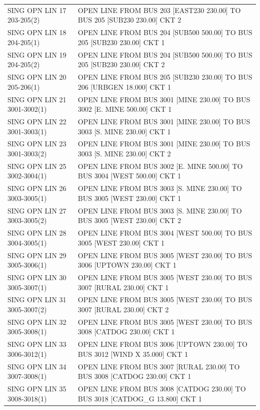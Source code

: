 \documentclass[10pt]{report}
\begin{document}
\begin{table}
{\begin{tabular}{ll}
SING OPN LIN   17 203-205(2) & OPEN LINE FROM BUS 203 [EAST230 230.00] TO BUS 205 [SUB230 230.00] CKT 2 \\
SING OPN LIN   18 204-205(1) & OPEN LINE FROM BUS 204 [SUB500 500.00] TO BUS 205 [SUB230 230.00] CKT 1 \\
SING OPN LIN   19 204-205(2) & OPEN LINE FROM BUS 204 [SUB500 500.00] TO BUS 205 [SUB230 230.00] CKT 2 \\
SING OPN LIN   20 205-206(1) & OPEN LINE FROM BUS 205 [SUB230 230.00] TO BUS 206 [URBGEN 18.000] CKT 1 \\
SING OPN LIN   21 3001-3002(1) & OPEN LINE FROM BUS 3001 [MINE 230.00] TO BUS 3002 [E. MINE 500.00] CKT 1 \\
SING OPN LIN   22 3001-3003(1) & OPEN LINE FROM BUS 3001 [MINE 230.00] TO BUS 3003 [S. MINE 230.00] CKT 1 \\
SING OPN LIN   23 3001-3003(2) & OPEN LINE FROM BUS 3001 [MINE 230.00] TO BUS 3003 [S. MINE 230.00] CKT 2 \\
SING OPN LIN   25 3002-3004(1) & OPEN LINE FROM BUS 3002 [E. MINE 500.00] TO BUS 3004 [WEST 500.00] CKT 1 \\
SING OPN LIN   26 3003-3005(1) & OPEN LINE FROM BUS 3003 [S. MINE 230.00] TO BUS 3005 [WEST 230.00] CKT 1 \\
SING OPN LIN   27 3003-3005(2) & OPEN LINE FROM BUS 3003 [S. MINE 230.00] TO BUS 3005 [WEST 230.00] CKT 2 \\
SING OPN LIN   28 3004-3005(1) & OPEN LINE FROM BUS 3004 [WEST 500.00] TO BUS 3005 [WEST 230.00] CKT 1 \\
SING OPN LIN   29 3005-3006(1) & OPEN LINE FROM BUS 3005 [WEST 230.00] TO BUS 3006 [UPTOWN 230.00] CKT 1 \\
SING OPN LIN   30 3005-3007(1) & OPEN LINE FROM BUS 3005 [WEST 230.00] TO BUS 3007 [RURAL 230.00] CKT 1 \\
SING OPN LIN   31 3005-3007(2) & OPEN LINE FROM BUS 3005 [WEST 230.00] TO BUS 3007 [RURAL 230.00] CKT 2 \\
SING OPN LIN   32 3005-3008(1) & OPEN LINE FROM BUS 3005 [WEST 230.00] TO BUS 3008 [CATDOG 230.00] CKT 1 \\
SING OPN LIN   33 3006-3012(1) & OPEN LINE FROM BUS 3006 [UPTOWN 230.00] TO BUS 3012 [WIND X 35.000] CKT 1 \\
SING OPN LIN   34 3007-3008(1) & OPEN LINE FROM BUS 3007 [RURAL 230.00] TO BUS 3008 [CATDOG 230.00] CKT 1 \\
SING OPN LIN   35 3008-3018(1) & OPEN LINE FROM BUS 3008 [CATDOG 230.00] TO BUS 3018 [CATDOG\_G 13.800] CKT 1 \\

\end{tabular}}
\end{table}
\end{document}
